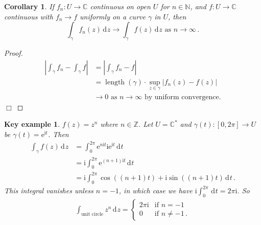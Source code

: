 \documentclass{article}
\theoremstyle{plain}\theoremheaderfont{\normalfont\itshape}\theorembodyfont{\rmfamily}\theoremseparator{.}\newtheorem*{rem}{Remark}\newtheorem*{ex}{Example}\newtheorem*{proof}{Proof}\newtheorem*{altp}{Alternative proof}\newtheorem*{con}{Consequences}\newtheorem*{notn}{Notations}\newtheorem*{cau}{Caution}\newtheorem*{term}{Terminology}\newtheorem*{keyex}{Key example}
\theoremstyle{plain}\theoremheaderfont{\normalfont\bfseries}\theorembodyfont{\rmfamily}\theoremseparator{.}\newtheorem{thm}{Theorem}[section]\newtheorem{lem}[thm]{Lemma}\newtheorem{prop}[thm]{Proposition}\newtheorem*{cor}{Corollary}\newtheorem{defn}[thm]{Definition}\newtheorem{clm}[thm]{Claim}\newtheorem{clminproof}{Claim}\newtheorem{leminproof}{Lemma}\newtheorem{app}{Application}
\theoremstyle{break}\theoremheaderfont{\normalfont\itshape}\theorembodyfont{\rmfamily}\theoremseparator{.\medskip}\newtheorem*{proofskip}{Proof}\newtheorem*{exs}{Examples}\newtheorem*{rems}{Remarks}\newtheorem*{rec}{Recall}\newtheorem*{ppts}{Properties}
\theoremstyle{break}\theoremheaderfont{\normalfont\bfseries}\theorembodyfont{\rmfamily}\theoremseparator{.\medskip}\newtheorem{lemskip}[thm]{Lemma}\newtheorem{defnskip}[thm]{Definition}\newtheorem{propskip}[thm]{Proposition}\newtheorem{thmskip}[thm]{Theorem}
\numberwithin{equation}{section}
\newcommand{\ii}{\mathrm{i}}
\newcommand{\ee}{\mathrm{e}}
\DeclareMathOperator*{\length}{length}
\newcommand{\qed}{\hfill\ensuremath{\Box}}
\newcommand{\abs}[1]{\left|#1\right|}
\newcommand{\dd}[2][]{\,\mathrm{d}^{#1} #2}
\newcommand{\NN}{\mathbb{N}}
\newcommand{\ZZ}{\mathbb{Z}}
\newcommand{\CC}{\mathbb{C}}
\begin{document}
    \begin{cor}
        If \(f_n:U\to\CC\) continuous on open \(U\) for \(n\in\NN\), and \(f:U\to\CC\) continuous with \(f_n\to f\) uniformly on a curve \(\gamma\) in \(U\), then
        \[\int_\gamma f_n(z)\dd{z}\to\int_{\gamma}f(z)\dd{z}\text{ as }n\to\infty\,.\]
    \end{cor}
    \begin{proof}
        \begin{align*}
            \abs{\int_\gamma f_n-\int_\gamma f}&=\abs{\int_\gamma f_n-f}\\
            &=\length(\gamma)\cdot\sup_{z\in\gamma}\abs{f_n(z)-f(z)}\\
            &\to 0\text{ as }n\to\infty\text{ by uniform convergence.}
        \end{align*}\qed
    \end{proof}
    \begin{keyex}
        \(f(z)=z^n\) where \(n\in\ZZ\). Let \(U=\CC^*\) and \(\gamma(t):[0,2\pi]\to U\) be \(\gamma(t)=\ee^{\ii t}\). Then
        \begin{align*}
            \int_\gamma f(z)\dd{z}&=\int_{0}^{2\pi}\ee^{n\ii t}\ii\ee^{\ii t}\dd{t}\\
            &=\ii\int_{0}^{2\pi}\ee^{(n+1)\ii t}\dd{t}\\
            &=\ii\int_{0}^{2\pi}\cos((n+1)t)+\ii\sin((n+1)t)\dd{t}\,.
        \end{align*}
        This integral vanishes unless \(n=-1\), in which case we have \(\ii\int_{0}^{2\pi}\dd{t}=2\pi \ii\). So
        \begin{align*}
            \int_{\text{unit circle}}z^n\dd{z}=\begin{cases}
                2\pi \ii& \text{if }n=-1\\
                0 & \text{if }n\ne -1\,.
            \end{cases}
        \end{align*}
    \end{keyex}
\end{document}
